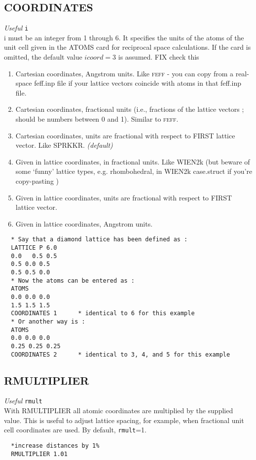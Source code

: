 \documentclass[11pt,oneside]{report} %
\newcommand{\program}[1]{\textsc{#1}}
\newcommand{\feff}{\program{feff}}
\newenvironment{Card}[4]%
      {\vspace{3ex}%
        \subsection{#1}
        \quad\textsl{#3}\newline
        \quad\texttt{#2}\newline%
        \label{card:#4}\\}
      {}
\begin{document}
\begin{Card}{COORDINATES}{i}{Useful}{coo}
  i must be an integer from 1 through 6.  It specifies the units of the atoms of the unit cell given in the ATOMS card for reciprocal space calculations.    
  If the card is omitted, the default value $icoord=3$ is assumed. FIX check this
  \begin{enumerate}
  \item Cartesian coordinates, Angstrom units.  Like {\feff} - you can copy from a real-space feff.inp file if your lattice vectors coincide with atoms in that feff.inp file.
  \item Cartesian coordinates, fractional units (i.e., fractions of the lattice vectors ; should be numbers between 0 and 1).  Similar to {\feff}.
  \item Cartesian coordinates, units are fractional with respect to FIRST lattice vector.  Like SPRKKR. \emph{(default)}
  \item Given in lattice coordinates, in fractional units.  Like WIEN2k (but beware of some `funny' lattice types, e.g. rhombohedral, in WIEN2k case.struct if you're copy-pasting )
  \item Given in lattice coordinates, units are fractional with respect to FIRST lattice vector.
  \item Given in lattice coordinates, Angstrom units.
  \end{enumerate}
\begin{verbatim}
  * Say that a diamond lattice has been defined as :
  LATTICE P 6.0
  0.0	0.5 0.5
  0.5 0.0 0.5
  0.5 0.5 0.0
  * Now the atoms can be entered as :
  ATOMS
  0.0 0.0 0.0
  1.5 1.5 1.5
  COORDINATES 1      * identical to 6 for this example
  * Or another way is :
  ATOMS
  0.0 0.0 0.0
  0.25 0.25 0.25
  COORDINATES 2      * identical to 3, 4, and 5 for this example
\end{verbatim}
\end{Card}



\begin{Card}{RMULTIPLIER}{rmult}{Useful}{rmu}
  With RMULTIPLIER all atomic coordinates are multiplied by the
  supplied value. This is useful to adjust lattice spacing, for
  example, when fractional unit cell coordinates are used. By
  default, \texttt{rmult}=1.
\begin{verbatim}
  *increase distances by 1%
  RMULTIPLIER 1.01
\end{verbatim}
\end{Card}
\end{document}
